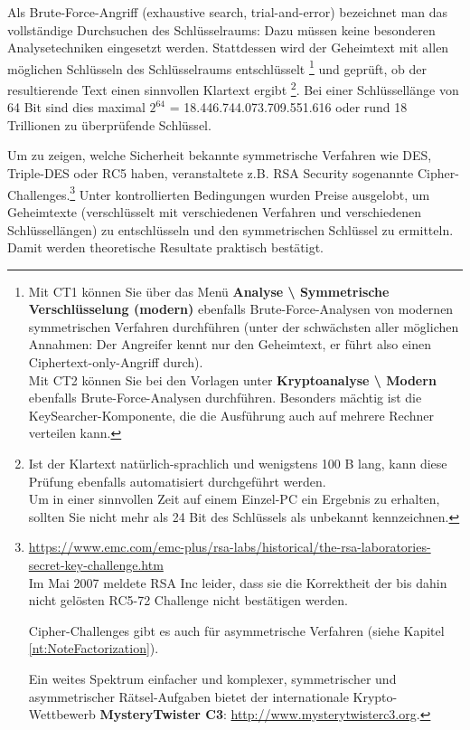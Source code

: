 \begin{refsegment}
\begin{sloppypar}
Als Brute-Force-Angriff (exhaustive search, trial-and-error) bezeichnet
man das vollständige Durchsuchen des Schlüsselraums: Dazu müssen
keine besonderen Analysetechniken eingesetzt werden. Stattdessen wird
der Geheimtext mit allen möglichen Schlüsseln des Schlüsselraums
entschlüsselt%
\footnote{%
  Mit CT1 können Sie über das Menü
  {\bf Analyse \textbackslash{} Symmetrische Verschlüsselung (modern)}
  ebenfalls Brute-Force-Analysen von modernen symmetrischen Verfahren
  durchführen (unter der schwächsten aller möglichen Annahmen: Der
  Angreifer kennt nur den Geheimtext, er führt also einen
  Ciphertext-only-Angriff durch).\\
  Mit CT2 können Sie bei den Vorlagen unter
  {\bf Kryptoanalyse \textbackslash{} Modern} ebenfalls Brute-Force-Analysen
  durchführen. Besonders mächtig ist die KeySearcher-Komponente, die
  die Ausführung auch auf mehrere Rechner verteilen kann.
}
und geprüft, ob der resultierende Text einen sinnvollen
Klartext ergibt%
\footnote{%
  Ist der Klartext natürlich-sprachlich und wenigstens 100 B lang, kann
  diese Prüfung ebenfalls automatisiert durchgeführt werden.\\
  Um in einer sinnvollen Zeit auf einem Einzel-PC ein Ergebnis zu
  erhalten, sollten Sie nicht mehr als 24 Bit des Schlüssels als
  unbekannt kennzeichnen.}.
Bei einer Schlüssellänge von 64 Bit sind dies maximal
$2^{64}$ = 18.446.744.073.709.551.616 oder rund 18 Trillionen zu
überprüfende Schlüssel.
\end{sloppypar}

Um zu zeigen, welche Sicherheit bekannte symmetrische Verfahren wie
DES, Triple-DES oder RC5
haben, veranstaltete z.B. RSA Security
sogenannte Cipher-Challenges.\footnote{%
  \url{https://www.emc.com/emc-plus/rsa-labs/historical/the-rsa-laboratories-secret-key-challenge.htm}\\
  Im Mai 2007 meldete RSA Inc leider, dass sie die Korrektheit der bis dahin
  nicht gelösten RC5-72 Challenge nicht bestätigen werden.

  Cipher-Challenges gibt es auch für asymmetrische Verfahren
  (siehe Kapitel \ref{nt:NoteFactorization}).

  Ein weites Spektrum einfacher und komplexer, symmetrischer und asymmetrischer
  Rätsel-Aufgaben bietet der internationale Krypto-Wettbewerb
  {\bf MysteryTwister C3}: %
  \url{http://www.mysterytwisterc3.org}.
  }
Unter kontrollierten Bedingungen wurden Preise ausgelobt, um Geheimtexte
(verschlüsselt mit verschiedenen Verfahren und verschiedenen
Schlüssellängen) zu entschlüsseln und den symmetrischen Schlüssel
zu ermitteln. Damit werden theoretische Resultate praktisch bestätigt.


\end{refsegment}
